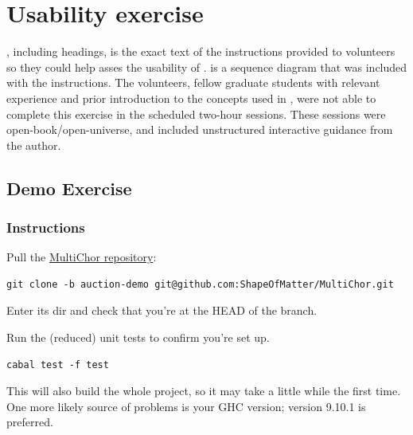 
\titleformat{\chapter}[hang] 
{\normalfont\huge\bfseries}{\chaptertitlename\ \thechapter:}{1em}{} 

\chapter{Usability exercise}
\label{sec:usability-exercise}

, including headings, is the exact text
of the instructions provided to volunteers so they could help asses the usability of \MultiChor.
 is a sequence diagram that was included with the instructions.
The volunteers, fellow graduate students with relevant experience and prior introduction to the concepts used in \MultiChor,
were not able to complete this exercise in the scheduled two-hour sessions.
These sessions were open-book/open-universe,
and included unstructured interactive guidance from the author.


\section{\MultiChor Demo Exercise}
\label{sec:usability-exercise-text}

\subsection{Instructions}

Pull the \href{https://github.com/ShapeOfMatter/MultiChor/tree/auction-demo}{MultiChor repository}:

\begin{verbatim}
git clone -b auction-demo git@github.com:ShapeOfMatter/MultiChor.git
\end{verbatim}

Enter its dir and check that you're at the HEAD of the  branch.

Run the (reduced) unit tests to confirm you're set up.

\begin{verbatim}
cabal test -f test
\end{verbatim}

This will also build the whole project, so it may take a little while the first time.
One more likely source of problems is your GHC version;
version 9.10.1 is preferred.

